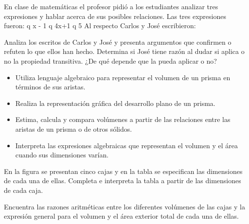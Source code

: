 \ejemplo

En clase de matemáticas el profesor pidió a los estudiantes analizar tres expresiones y hablar acerca de sus posibles relaciones. Las tres expresiones fueron: q x - 1 q 4x+1 q 5 Al respecto Carlos y José escribieron:


Analiza los escritos de Carlos y José y presenta argumentos que confirmen o refuten lo que ellos han hecho. Determina si José tiene razón al dudar si aplica o no la propiedad transitiva. ¿De qué depende que la pueda aplicar o no?



\evidencias

\begin{itemize}
  \item Utiliza lenguaje algebraico para representar el volumen de un prisma en términos de sus aristas.
  \item Realiza la representación gráfica del desarrollo plano de un prisma.
  \item Estima, calcula y compara volúmenes a partir de las relaciones entre las aristas de un prisma o de otros sólidos.
  \item Interpreta las expresiones algebraicas que representan el volumen y el área cuando sus dimensiones varían.
\end{itemize}

\ejemplo

En la figura se presentan cinco cajas y en la tabla se especifican las dimensiones de cada una de ellas. Completa e interpreta la tabla a partir de las dimensiones de cada caja.


Encuentra las razones aritméticas entre los diferentes volúmenes de las cajas y la expresión general para el volumen y el área exterior total de cada una de ellas.



\evidencias

